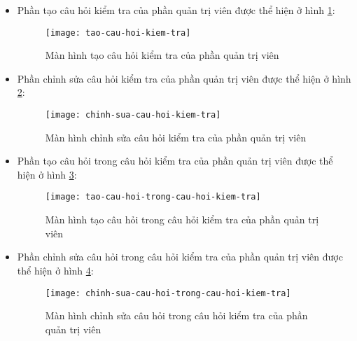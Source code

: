\documentclass[../Thesis.tex]{subfiles}
\begin{document}
\begin{itemize}
                \item Phần tạo câu hỏi kiểm tra của phần quản trị viên được thể hiện ở hình \ref{fig:tao-cau-hoi-kiem-tra}:
                \begin{figure}[hbt!]
                    \centering\texttt{[image: tao-cau-hoi-kiem-tra]}
                    \caption{Màn hình tạo câu hỏi kiểm tra của phần quản trị viên}
                    \label{fig:tao-cau-hoi-kiem-tra}
                \end{figure}
                \FloatBarrier

                \item Phần chỉnh sửa câu hỏi kiểm tra của phần quản trị viên được thể hiện ở hình \ref{fig:chinh-sua-cau-hoi-kiem-tra}:
                \begin{figure}[hbt!]
                    \centering\texttt{[image: chinh-sua-cau-hoi-kiem-tra]}
                    \caption{Màn hình chỉnh sửa câu hỏi kiểm tra của phần quản trị viên}
                    \label{fig:chinh-sua-cau-hoi-kiem-tra}
                \end{figure}
                \FloatBarrier

                \item Phần tạo câu hỏi trong câu hỏi kiểm tra của phần quản trị viên được thể hiện ở hình \ref{fig:tao-cau-hoi-trong-cau-hoi-kiem-tra}:
                \begin{figure}[hbt!]
                    \centering\texttt{[image: tao-cau-hoi-trong-cau-hoi-kiem-tra]}
                    \caption{Màn hình tạo câu hỏi trong câu hỏi kiểm tra của phần quản trị viên}
                    \label{fig:tao-cau-hoi-trong-cau-hoi-kiem-tra}
                \end{figure}
                \FloatBarrier

                \item Phần chỉnh sửa câu hỏi trong câu hỏi kiểm tra của phần quản trị viên được thể hiện ở hình \ref{fig:chinh-sua-cau-hoi-trong-cau-hoi-kiem-tra}:
                \begin{figure}[hbt!]
                    \centering\texttt{[image: chinh-sua-cau-hoi-trong-cau-hoi-kiem-tra]}
                    \caption{Màn hình chỉnh sửa câu hỏi trong câu hỏi kiểm tra của phần quản trị viên}
                    \label{fig:chinh-sua-cau-hoi-trong-cau-hoi-kiem-tra}
                \end{figure}
                \FloatBarrier


\end{itemize}
\end{document}
